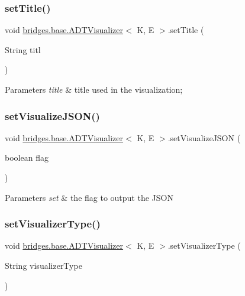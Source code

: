 \subsubsection{\texorpdfstring{set\+Title()}{setTitle()}}
{\footnotesize\ttfamily void \hyperlink{classbridges_1_1base_1_1_a_d_t_visualizer}{bridges.\+base.\+A\+D\+T\+Visualizer}$<$ K, E $>$.set\+Title (\begin{DoxyParamCaption}\item[{String}]{titl }\end{DoxyParamCaption})}


\begin{DoxyParams}{Parameters}
{\em title} & title used in the visualization; \\
\hline
\end{DoxyParams}
\hypertarget{classbridges_1_1base_1_1_a_d_t_visualizer_a784ce15d23e6c8ff0d6e77f2274e2980}{}\label{classbridges_1_1base_1_1_a_d_t_visualizer_a784ce15d23e6c8ff0d6e77f2274e2980} 
\subsubsection{\texorpdfstring{set\+Visualize\+J\+S\+O\+N()}{setVisualizeJSON()}}
{\footnotesize\ttfamily void \hyperlink{classbridges_1_1base_1_1_a_d_t_visualizer}{bridges.\+base.\+A\+D\+T\+Visualizer}$<$ K, E $>$.set\+Visualize\+J\+S\+ON (\begin{DoxyParamCaption}\item[{boolean}]{flag }\end{DoxyParamCaption})}


\begin{DoxyParams}{Parameters}
{\em set} & the flag to output the J\+S\+ON \\
\hline
\end{DoxyParams}
\hypertarget{classbridges_1_1base_1_1_a_d_t_visualizer_a5f423ff4295f3ae4371c86d4ab45638c}{}\label{classbridges_1_1base_1_1_a_d_t_visualizer_a5f423ff4295f3ae4371c86d4ab45638c} 
\subsubsection{\texorpdfstring{set\+Visualizer\+Type()}{setVisualizerType()}}
{\footnotesize\ttfamily void \hyperlink{classbridges_1_1base_1_1_a_d_t_visualizer}{bridges.\+base.\+A\+D\+T\+Visualizer}$<$ K, E $>$.set\+Visualizer\+Type (\begin{DoxyParamCaption}\item[{String}]{visualizer\+Type }\end{DoxyParamCaption})}


